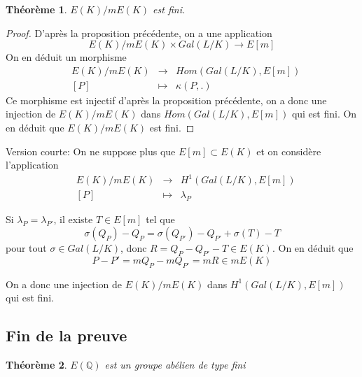 \documentclass{article}
\newtheorem{theoreme}{Théorème}
\begin{document}
\begin{theoreme}
$E(K)/mE(K)$ est fini.
\end{theoreme}

\begin{proof}
D'après la proposition précédente, on a une application
\begin{equation*}
E(K)/mE(K) \times Gal(L/K) \longrightarrow E[m]
\end{equation*}
On en déduit un morphisme
\begin{equation*}
\begin{array}{lrcl}
&E(K)/mE(K) & \longrightarrow & Hom(Gal(L/K), E[m]) \\
	 & [P] & \longmapsto & \kappa(P, .)
\end{array}
\end{equation*}
Ce morphisme est injectif d'après la proposition précédente, on a donc une injection de $E(K)/mE(K)$ dans
$Hom(Gal(L/K), E[m])$ qui est fini. On en déduit que $E(K)/mE(K)$ est fini.
\end{proof}

Version courte: On ne suppose plus que $E[m] \subset E(K)$ et on considère l'application
\begin{equation*}
\begin{array}{lrcl}
&E(K)/mE(K) & \longrightarrow & H^1(Gal(L/K), E[m]) \\
	 & [P] & \longmapsto & \lambda_{P}
\end{array}
\end{equation*}

Si $\lambda_{P} = \lambda_{P'}$, il existe $T\in E[m]$ tel que
\begin{equation*}
\sigma(Q_{P}) - Q_{P} = \sigma(Q_{P'}) - Q_{P'} + \sigma(T) - T
\end{equation*}
pour tout $\sigma \in Gal(L/K)$, donc $R = Q_{P} - Q_{P'} - T \in E(K)$. On en déduit que
\begin{equation*}
P-P' = mQ_{P} - mQ_{P'} = mR \in mE(K)
\end{equation*}

On a donc une injection de $E(K)/mE(K)$ dans $H^1(Gal(L/K), E[m])$ qui est fini.

\subsection{Fin de la preuve}
\begin{theoreme}
$E(\mathbb{Q})$ est un groupe abélien de type fini
\end{theoreme}
\end{document}
